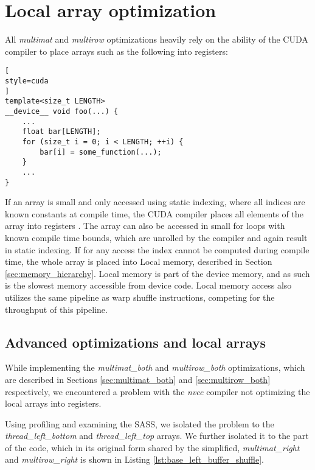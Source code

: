 \chapter{Local array optimization}

\label{sec:local_array_optimization}

All \textit{multimat} and \textit{multirow} optimizations heavily rely on the ability of the CUDA compiler to place arrays such as the following into registers:

\begin{lstlisting}[
style=cuda
]
template<size_t LENGTH>
__device__ void foo(...) {
	...
	float bar[LENGTH];
	for (size_t i = 0; i < LENGTH; ++i) {
		bar[i] = some_function(...);
	}
	...
}
\end{lstlisting}

If an array is small and only accessed using static indexing, where all indices are known constants at compile time, the CUDA compiler places all elements of the array into registers \citep{site:private_arrays_cuda}. The array can also be accessed in small for loops with known compile time bounds, which are unrolled by the compiler and again result in static indexing. If for any access the index cannot be computed during compile time, the whole array is placed into Local memory, described in Section \ref{sec:memory_hierarchy}. Local memory is part of the device memory, and as such is the slowest memory accessible from device code. Local memory access also utilizes the same pipeline as warp shuffle instructions, competing for the throughput of this pipeline. 


\section{Advanced optimizations and local arrays}
\label{sec:local_array_optimization_code_changes}

While implementing the \textit{multimat\_both} and \textit{multirow\_both} optimizations, which are described in  Sections \ref{sec:multimat_both} and \ref{sec:multirow_both} respectively, we encountered a problem with the \textit{nvcc} compiler not optimizing the local arrays into registers. 

Using profiling and examining the SASS, we isolated the problem to the \textit{thread\_left\_bottom} and \textit{thread\_left\_top} arrays. We further isolated it to the part of the code, which in its original form shared by the simplified, \textit{multimat\_right} and \textit{multirow\_right} is shown in Listing  \ref{lst:base_left_buffer_shuffle}.

